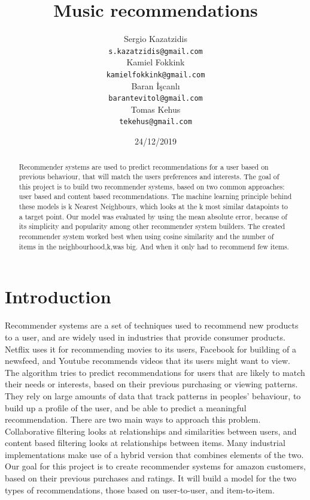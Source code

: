 \documentclass[11pt]{article}
\title{Music recommendations}
\author{Sergio Kazatzidis \\
	{\tt s.kazatzidis@gmail.com} \\
	Kamiel Fokkink \\
	{\tt kamielfokkink@gmail.com} \\\And
	Baran İşcanlı \\
	{\tt barantevitol@gmail.com} \\
	Tomas Kehus \\
	{\tt tekehus@gmail.com}}
\date{24/12/2019}
\begin{document}
	\maketitle
	\begin{abstract}
		Recommender systems are used to predict recommendations for a user based on previous behaviour, that will match the users preferences and interests. The goal of this project is to build two recommender systems, based on two common approaches: user based and content based recommendations. The machine learning principle behind these models is k Nearest Neighbours, which looks at the k most similar datapoints to a target point. Our model was evaluated by using the mean absolute error, because of its simplicity and popularity among other recommender system builders. The created recommender system worked best when using cosine similarity and the number of items in the neighbourhood,k,was big. And when it only had to recommend few items.
	\end{abstract}
	
	\noindent
	
	\section{Introduction}
	Recommender systems are a set of techniques used to recommend new products to a user, and are widely used in industries that provide consumer products. Netflix uses it for recommending movies to its users, Facebook for building of a newsfeed, and Youtube recommends videos that its users might want to view. The algorithm tries to predict recommendations for users that are likely to match their needs or interests, based on their previous purchasing or viewing patterns. They rely on large amounts of data that track patterns in peoples' behaviour, to build up a profile of the user, and be able to predict a meaningful recommendation. There are two main ways to approach this problem. Collaborative filtering looks at relationships and similarities between users, and content based filtering looks at relationships between items. Many industrial implementations make use of a hybrid version that combines elements of the two. Our goal for this project is to create recommender systems for amazon customers, based on their previous purchases and ratings. It will build a model for the two types of recommendations, those based on user-to-user, and item-to-item. \\
	
\end{document}
